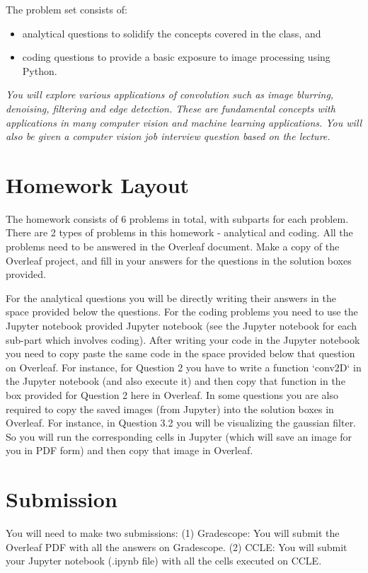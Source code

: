 \documentclass[answers]{exam}
\begin{document}
The problem set consists of: 
\begin{itemize}
    \item analytical questions to solidify the concepts covered in the class, and
    \item coding questions to provide a basic exposure to image processing using Python.
\end{itemize}

\emph{You will explore various applications of convolution such as image blurring, denoising, filtering and edge detection. These are fundamental concepts with applications in many computer vision and machine learning applications. You will also be given a computer vision job interview question based on the lecture.}

\section*{Homework Layout}
The homework consists of 6 problems in total, with subparts for each problem. There are 2 types of problems in this homework - analytical and coding. All the problems need to be answered in the Overleaf document. Make a copy of the Overleaf project, and fill in your answers for the questions in the solution boxes provided. 

For the analytical questions you will be directly writing their answers in the space provided below the questions. For the coding problems you need to use the Jupyter notebook provided Jupyter notebook (see the Jupyter notebook for each sub-part which involves coding). After writing your code in the Jupyter notebook you need to copy paste the same code in the space provided below that question on Overleaf. For instance, for Question 2 you have to write a function `conv2D` in the Jupyter notebook (and also execute it) and then copy that function in the box provided for Question 2 here in Overleaf. In some questions you are also required to copy the saved images (from Jupyter) into the solution boxes in Overleaf. For instance, in Question 3.2 you will be visualizing the gaussian filter. So you will run the corresponding cells in Jupyter (which will save an image for you in PDF form) and then copy that image in Overleaf.

\section*{Submission}

You will need to make two submissions: (1) Gradescope: You will submit the Overleaf PDF with all the answers on Gradescope. (2) CCLE: You will submit your Jupyter notebook (.ipynb file) with all the cells executed on CCLE. 
\end{document}
